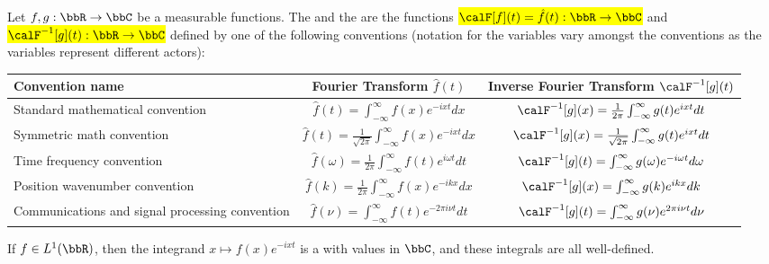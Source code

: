 \begin{definition} \label{definition:fourier_transform_of_an_L_1_function_on_R}
    Let $f,g: \bbR \to \bbC$ be a measurable functions. The  and the  are the functions \hl{$\calF[f](t) = \hat{f}(t): \bbR \to \bbC$} and \hl{$\calF^{-1}[g](t): \bbR \to \bbC$} defined by one of the following conventions (notation for the variables vary amongst the conventions as the variables represent different actors):

    \begin{center}
    \begin{tabular}{|p{4cm}|c|c|} \hline
        Convention name & Fourier Transform $\hat{f}(t)$ & Inverse Fourier Transform $\calF^{-1}[g](t)$  \\ \hline Standard mathematical convention & $\hat{f}(t) = \int_{-\infty}^\infty f(x) e^{-ixt} dx$ & $\calF^{-1}[g](x) = \frac{1}{2\pi} \int_{-\infty}^{\infty} g(t) e^{ixt} dt$ \\ 
        \hline Symmetric math convention & $\hat{f}(t) = \frac{1}{\sqrt{2\pi}} \int_{-\infty}^{\infty} f(x) e^{-ixt}  dx$ & $\calF^{-1}[g](x) = \frac{1}{\sqrt{2\pi}} \int_{-\infty}^\infty g(t) e^{ixt} dt$ \\
        \hline Time frequency convention & $\hat{f}(\omega) = \frac{1}{2\pi} \int_{-\infty}^{\infty} f(t) e^{i \omega t} dt$ & $\calF^{-1}[g](t) = \int_{-\infty}^\infty g(\omega ) e^{-i \omega t} d \omega $ \\ 
        \hline Position wavenumber convention & $\hat{f}(k) = \frac{1}{2\pi} \int_{-\infty}^{\infty} f(x) e^{-i k x }  dx$ & $\calF^{-1}[g](x) = \int_{-\infty}^\infty g(k) e^{i k x} dk$ \\
        \hline Communications and signal processing convention & $\hat{f}(\nu) = \int_{-\infty}^{\infty} f(t) e^{-2\pi i \nu t}  dt$ & $\calF^{-1}[g](t) = \int_{-\infty}^\infty g(\nu) e^{2 \pi i \nu t} d\nu$ \\\hline 
    \end{tabular}
    \end{center}

    If $f \in L^1(\bbR)$, then the integrand $x \mapsto f(x)e^{-ixt}$ is a  with values in $\bbC$, and these integrals are all well-defined.
\end{definition}